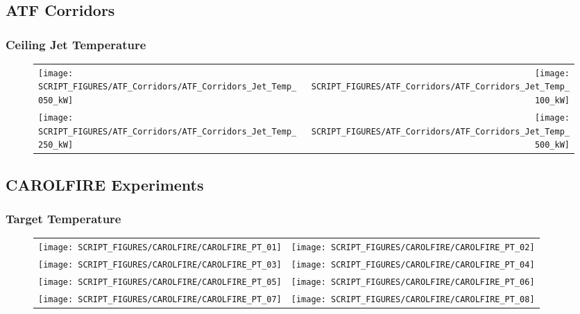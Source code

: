 

\subsection{ATF Corridors}

\subsubsection{Ceiling Jet Temperature}

\begin{figure}[p]
\begin{tabular*}{\textwidth}{l@{\extracolsep{\fill}}r}
\texttt{[image: SCRIPT\_FIGURES/ATF\_Corridors/ATF\_Corridors\_Jet\_Temp\_050\_kW]} &
\texttt{[image: SCRIPT\_FIGURES/ATF\_Corridors/ATF\_Corridors\_Jet\_Temp\_100\_kW]} \\
\texttt{[image: SCRIPT\_FIGURES/ATF\_Corridors/ATF\_Corridors\_Jet\_Temp\_250\_kW]} &
\texttt{[image: SCRIPT\_FIGURES/ATF\_Corridors/ATF\_Corridors\_Jet\_Temp\_500\_kW]}
\end{tabular*}
\end{figure}

\clearpage

\subsection{CAROLFIRE Experiments}

\subsubsection{Target Temperature}

\begin{figure}[p]
\begin{tabular*}{\textwidth}{l@{\extracolsep{\fill}}r}
\texttt{[image: SCRIPT\_FIGURES/CAROLFIRE/CAROLFIRE\_PT\_01]} &
\texttt{[image: SCRIPT\_FIGURES/CAROLFIRE/CAROLFIRE\_PT\_02]} \\
\texttt{[image: SCRIPT\_FIGURES/CAROLFIRE/CAROLFIRE\_PT\_03]} &
\texttt{[image: SCRIPT\_FIGURES/CAROLFIRE/CAROLFIRE\_PT\_04]} \\
\texttt{[image: SCRIPT\_FIGURES/CAROLFIRE/CAROLFIRE\_PT\_05]} &
\texttt{[image: SCRIPT\_FIGURES/CAROLFIRE/CAROLFIRE\_PT\_06]} \\
\texttt{[image: SCRIPT\_FIGURES/CAROLFIRE/CAROLFIRE\_PT\_07]} &
\texttt{[image: SCRIPT\_FIGURES/CAROLFIRE/CAROLFIRE\_PT\_08]}
\end{tabular*}
\end{figure}


